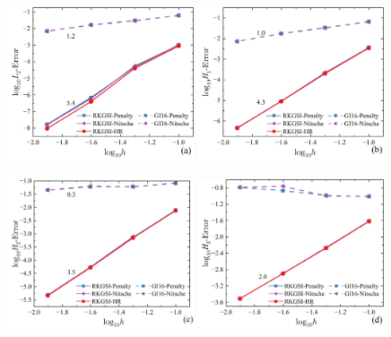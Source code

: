 \newpage
\begin{figure}[H]
    \centering
    \begin{subcaptiongroup}
    \includegraphics[width=0.49\textwidth]{figure/PHR/T/QL2.png}
    \label{TQL2}
    \includegraphics[width=0.49\textwidth]{figure/PHR/T/QH1.png}
    \label{TQH1}
    \end{subcaptiongroup}
    \begin{subcaptiongroup}
    \includegraphics[width=0.49\textwidth]{figure/PHR/T/QH2.png}
    \label{TQH2}
    \includegraphics[width=0.49\textwidth]{figure/PHR/T/QH3.png}
    \label{TQH3}
    \end{subcaptiongroup}
\caption{}
\label{TQLH}
\end{figure}

